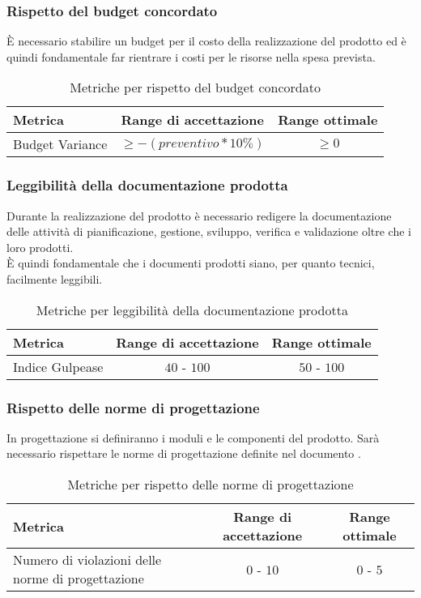 \documentclass[../PianoDiQualifica.tex]{subfiles}
\begin{document}
			\subsubsection{Rispetto del budget concordato}
				È necessario stabilire un budget per il costo della realizzazione del prodotto ed è
				quindi fondamentale far rientrare i costi per le risorse nella spesa prevista.\\
				\normalsize
				\begin{table}[H]
				\center
					\begin{tabular}{|p{6.5cm}|c|c|}
						\hline
						\rowcolor{blue!30}\textbf{Metrica} & \textbf{Range di accettazione} & \textbf{Range ottimale} \\ \hline
						Budget Variance & $\geq -(preventivo*10\%)$ & $\geq 0$ \\ \hline
					\end{tabular}
					\caption{Metriche per rispetto del budget concordato}
				\end{table}
			\subsubsection{Leggibilità della documentazione prodotta}
				Durante la realizzazione del prodotto è necessario redigere la documentazione
				delle attività di pianificazione, gestione, sviluppo, verifica e validazione oltre
				che i loro prodotti.\\
				È quindi fondamentale che i documenti prodotti siano, per quanto tecnici,
				facilmente leggibili.\\
				\normalsize
				\begin{table}[H]
				\center
					\begin{tabular}{|p{6.5cm}|c|c|}
						\hline
						\rowcolor{blue!30}\textbf{Metrica} & \textbf{Range di accettazione} & \textbf{Range ottimale} \\ \hline
						Indice Gulpease & $40$ - $100$ & $50$ - $100$ \\ \hline
					\end{tabular}
					\caption{Metriche per leggibilità della documentazione prodotta}
				\end{table}
			\subsubsection{Rispetto delle norme di progettazione}
				In progettazione si definiranno i moduli e le componenti del prodotto. Sarà necessario
				rispettare le norme di progettazione definite nel documento \normediprogetto.\\
				\normalsize
				\begin{table}[H]
				\center
					\begin{tabular}{|p{6.5cm}|c|c|}
						\hline
						\rowcolor{blue!30}\textbf{Metrica} & \textbf{Range di accettazione} & \textbf{Range ottimale} \\ \hline
						Numero di violazioni delle norme di progettazione & $0$ - $10$ & $0$ - $5$\\ \hline
					\end{tabular}
					\caption{Metriche per rispetto delle norme di progettazione}
				\end{table}
\end{document}
